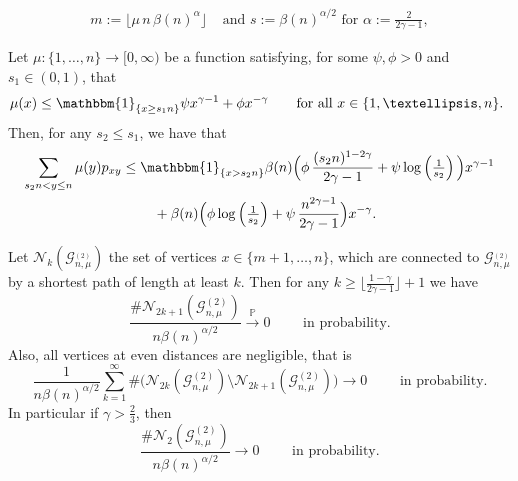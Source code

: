 \documentclass[10pt,a4paper]{amsart}
\begin{document}
\begin{align}\label{mmudef}
    m:=\lfloor \mu \,n\,\beta(n)^{\alpha}\rfloor & \text{ and } s:=\beta(n)^{\alpha /2 } \text{  for } \alpha:=\tfrac{2}{2\gamma-1},
\end{align} 

    \begin{lemma} \label{1.3}
		Let $\mu \colon\{1,\dots,n\}\to[0,\infty)$ be a function satisfying, for some $\psi, \phi >0$ and $s_1\in(0,1)$, that
		\begin{align*}
			\mu(x)\le \mathbbm{1}_{\{x\ge s_1 n\}}\psi x^{\gamma-1}+\phi x^{-\gamma}
            \qquad
		\text{for all $x\in\{1,\dots,n\}$. }
        \end{align*}
        Then, for any $s_2\le s_1 $,  we have that
		\begin{align*}
			\sum_{s_2 n<y\le n}\mu(y) p_{xy} & \le \mathbbm{1}_{\{x >s_2 n\}}\beta(n) \Big(\phi \,\frac{(s_2 n)^{1-2\gamma}}{2 \gamma -1}+\psi\log\left(\tfrac{1}{s_2}\right)\Big) x^{\gamma-1}\\& \phantom{xxxx} +\beta(n) \Big(\phi \log\left(\tfrac{1}{s_2}\right)+\psi\,\frac{n^{2 \gamma -1}}{2 \gamma -1}\Big) x^{-\gamma}.
		\end{align*}
	\end{lemma}

\begin{lemma}\label{pathlength}
Let
$\mathcal{N}_k(\mathcal G_{n,\mu}^{_{(2)}})$ the set of vertices $x\in\{m+1,\ldots,n\}$, which are connected to $\mathcal G_{n,\mu}^{_{(2)}}$ by a shortest path of length at least $k$.  Then for any $k\ge\big\lfloor\tfrac{1-\gamma}{2\gamma-1}\big\rfloor +1  $ we have 
$$\frac{\#\mathcal{N}_{2k+1}(\mathcal G_{n,\mu}^{(2)})}{n\beta(n)^{\alpha/2}}\overset{\mathbb P}{\longrightarrow }0\qquad \text{ in probability.}$$
Also, all vertices at even distances are negligible, that is
$$\frac{1}{n\beta(n)^{\alpha/2}}\sum_{k=1}^\infty \#\big(\mathcal{N}_{2k}(\mathcal G_{n,\mu}^{(2)})\setminus \mathcal{N}_{2k+1}(\mathcal G_{n,\mu}^{(2)})\big)
\longrightarrow 0\qquad \text{ in probability.}$$
In particular if $\gamma>\tfrac23$, then
$$\frac{\#\mathcal{N}_2(\mathcal G_{n,\mu}^{(2)})}{n\beta(n)^{\alpha/2}}\longrightarrow 0\qquad \text{ in probability.}$$
    
\end{lemma}
\end{document}
